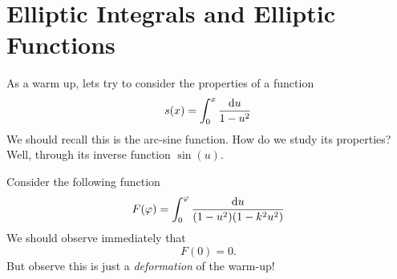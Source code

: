 
\section{Elliptic Integrals and Elliptic Functions}
\M
As a warm up, lets try to consider the properties of a function
\begin{equation}
s(x)=\int^{x}_{0}\frac{\mathrm{d} u}{1-u^{2}}
\end{equation}
We should recall this is the arc-sine function. How do we study
its properties? Well, through its inverse function $\sin(u)$. 

\M
Consider the following function
\begin{equation}
F(\varphi) =
\int^{\varphi}_{0}\frac{\mathrm{d} u}{(1-u^{2})(1-k^{2}u^{2})}
\end{equation}
We should observe immediately that
\begin{equation}
F(0)=0.
\end{equation}
But observe this is just a \emph{deformation} of the warm-up!

